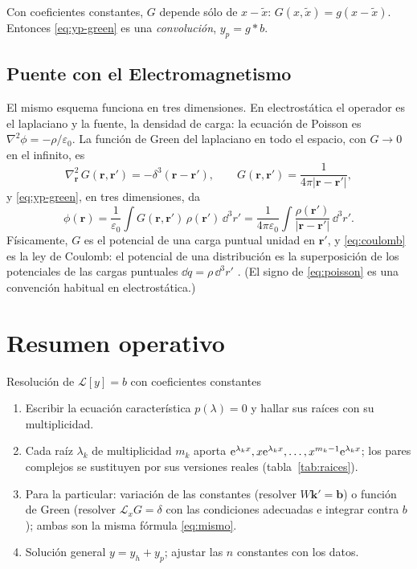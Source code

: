 \documentclass[11pt,twoside]{article}
\newcommand\Lop{\mathcal L}
\newcommand\vk{\bm k}
\newcommand\vb{\bm b}
\newcommand\abs[1]{\lvert#1\rvert}
\newcommand\xt{\tilde x}
\begin{document}
\begin{observacion}\label{obs:traslacion}
Con coeficientes constantes, $G$ depende sólo de $x-\xt$: $G(x,\xt)=g(x-\xt)$. Entonces \eqref{eq:yp-green} es una
\emph{convolución}, $y_p=g*b$.
\end{observacion}

\subsection{Puente con el Electromagnetismo}

El mismo esquema funciona en tres dimensiones. En electrostática el operador es el laplaciano y la fuente, la densidad de
carga: la ecuación de Poisson es $\nabla^2\phi=-\rho/\varepsilon_0$. La función de Green del laplaciano en todo el espacio, con
$G\to0$ en el infinito, es
\begin{equation}\label{eq:poisson}
\nabla_{\bm r}^2\,G(\bm r,\bm r')=-\delta^3(\bm r-\bm r'),\qquad G(\bm r,\bm r')=\frac{1}{4\pi\abs{\bm r-\bm r'}},
\end{equation}
y \eqref{eq:yp-green}, en tres dimensiones, da
\begin{equation}\label{eq:coulomb}
\phi(\bm r)=\frac1{\varepsilon_0}\int G(\bm r,\bm r')\,\rho(\bm r')\,\dd^3r'=\frac{1}{4\pi\varepsilon_0}\int\frac{\rho(\bm r')}{\abs{\bm r-\bm r'}}\,\dd^3r'.
\end{equation}
Físicamente, $G$ es el potencial de una carga puntual unidad en $\bm r'$, y \eqref{eq:coulomb} es la ley de Coulomb: el
potencial de una distribución es la superposición de los potenciales de las cargas puntuales $\dd q=\rho\,\dd^3r'$
\cite[§2.3]{griffiths}. (El signo de \eqref{eq:poisson} es una convención habitual en electrostática.)

\section{Resumen operativo}\label{sec:resumen}

\begin{metodo}{Resolución de $\Lop[y]=b$ con coeficientes constantes}
\begin{enumerate}
\item Escribir la ecuación característica $p(\lambda)=0$ y hallar sus raíces con su multiplicidad.
\item Cada raíz $\lambda_k$ de multiplicidad $m_k$ aporta $\mathrm{e}^{\lambda_kx},x\mathrm{e}^{\lambda_kx},\dots,x^{m_k-1}\mathrm{e}^{\lambda_kx}$; los
pares complejos se sustituyen por sus versiones reales (tabla~\ref{tab:raices}).
\item Para la particular: variación de las constantes (resolver $W\vk'=\vb$) o función de Green (resolver $\Lop_xG=\delta$
con las condiciones adecuadas e integrar contra $b$); ambas son la misma fórmula \eqref{eq:mismo}.
\item Solución general $y=y_h+y_p$; ajustar las $n$ constantes con los datos.
\end{enumerate}
\end{metodo}
\end{document}

